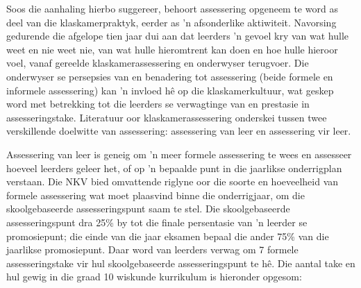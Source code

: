 Soos die aanhaling hierbo suggereer, behoort assessering opgeneem te
word as deel van die klaskamerpraktyk, eerder as 'n afsonderlike
aktiwiteit. Navorsing gedurende die afgelope tien jaar dui aan dat
leerders 'n gevoel kry van wat hulle weet en nie weet nie, van wat
hulle hieromtrent kan doen en hoe hulle hieroor voel, vanaf gereelde
klaskamerassessering en onderwyser terugvoer. Die onderwyser se
persepsies van en benadering tot assessering (beide formele en
informele assessering) kan 'n invloed h\^{e} op die klaskamerkultuur,
wat geskep word met betrekking tot die leerders se verwagtinge van en
prestasie in assesseringstake. Literatuur oor klaskamerassessering
onderskei tussen twee verskillende doelwitte van assessering:
assessering van leer en assessering vir leer.\par

Assessering van leer is geneig om 'n meer formele assessering te wees
en assesseer hoeveel leerders geleer het, of op 'n bepaalde punt in
die jaarlikse onderrigplan verstaan. Die NKV bied omvattende riglyne
oor die soorte en hoeveelheid van formele assessering wat moet
plaasvind binne die onderrigjaar, om die skoolgebaseerde
assesseringspunt saam te stel. Die skoolgebaseerde assesseringspunt
dra 25\% by tot die finale persentasie van 'n leerder se promosiepunt;
die einde van die jaar eksamen bepaal die ander 75\% van die jaarlikse
promosiepunt. Daar word van leerders verwag om 7 formele
assesseringstake vir hul skoolgebaseerde assesseringspunt te
h\^{e}. Die aantal take en hul gewig in die graad 10 wiskunde
kurrikulum is hieronder opgesom:

